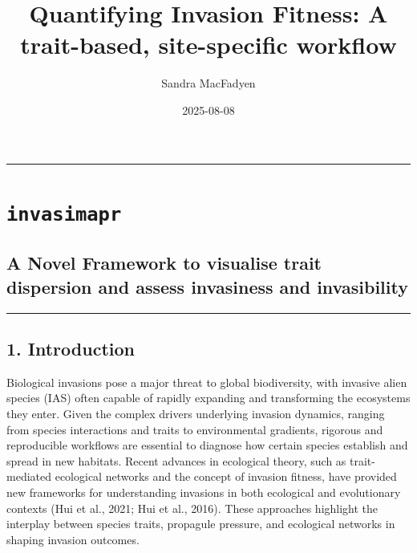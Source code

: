 \documentclass[
]{article}
\title{Quantifying Invasion Fitness: A trait-based, site-specific
workflow}
\author{Sandra MacFadyen}
\date{2025-08-08}
\begin{document}
\maketitle

{
\setcounter{tocdepth}{2}
\tableofcontents
}
\href{https://mybinder.org/v2/gh/nithecs-biomath/RBasicPack/master?urlpath=rstudio}{}
\href{https://lifecycle.r-lib.org/articles/stages.html\#stable}{}
\href{https://github.com/macSands/invasimapr/actions/workflows/test-coverage.yaml}{}
\href{https://app.codecov.io/gh/macSands/invasimapr}{}
\href{https://github.com/macSands/invasimapr/actions/workflows/R-CMD-check.yaml}{}

\begin{center}\rule{0.5\linewidth}{0.5pt}\end{center}

\hypertarget{invasimapr}{%
\section{\texorpdfstring{\texttt{invasimapr}}{invasimapr}}\label{invasimapr}}

\hypertarget{a-novel-framework-to-visualise-trait-dispersion-and-assess-invasiness-and-invasibility}{%
\subsection{A Novel Framework to visualise trait dispersion and assess
invasiness and
invasibility}\label{a-novel-framework-to-visualise-trait-dispersion-and-assess-invasiness-and-invasibility}}

\begin{center}\rule{0.5\linewidth}{0.5pt}\end{center}

\hypertarget{introduction}{%
\subsection{1. Introduction}\label{introduction}}

Biological invasions pose a major threat to global biodiversity, with
invasive alien species (IAS) often capable of rapidly expanding and
transforming the ecosystems they enter. Given the complex drivers
underlying invasion dynamics, ranging from species interactions and
traits to environmental gradients, rigorous and reproducible workflows
are essential to diagnose how certain species establish and spread in
new habitats. Recent advances in ecological theory, such as
trait-mediated ecological networks and the concept of invasion fitness,
have provided new frameworks for understanding invasions in both
ecological and evolutionary contexts (Hui et al., 2021; Hui et al.,
2016). These approaches highlight the interplay between species traits,
propagule pressure, and ecological networks in shaping invasion
outcomes.
\end{document}
